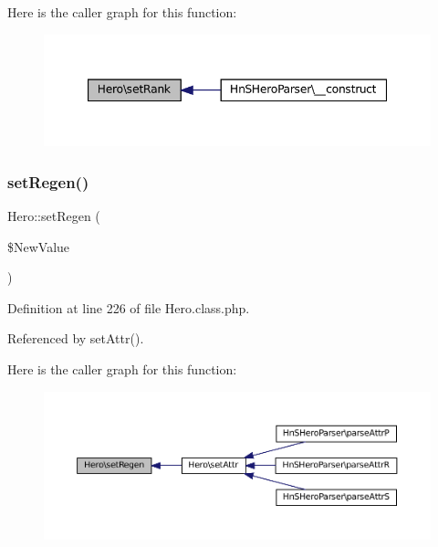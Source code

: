 Here is the caller graph for this function\+:\nopagebreak
\begin{figure}[H]
\begin{center}
\leavevmode
\includegraphics[width=347pt]{class_hero_a28f6b0ed48c9046e2ed5929784884ac6_icgraph}
\end{center}
\end{figure}
\mbox{\label{class_hero_a591551873c61bc27e203eca5e4b4a989}} 
\subsubsection{\texorpdfstring{set\+Regen()}{setRegen()}}
{\footnotesize\ttfamily Hero\+::set\+Regen (\begin{DoxyParamCaption}\item[{}]{\$\+New\+Value }\end{DoxyParamCaption})}



Definition at line 226 of file Hero.\+class.\+php.



Referenced by set\+Attr().

Here is the caller graph for this function\+:\nopagebreak
\begin{figure}[H]
\begin{center}
\leavevmode
\includegraphics[width=350pt]{class_hero_a591551873c61bc27e203eca5e4b4a989_icgraph}
\end{center}
\end{figure}
\mbox{\label{class_hero_a136f0b99dae0a4f99d9e30193ee3972a}} 

